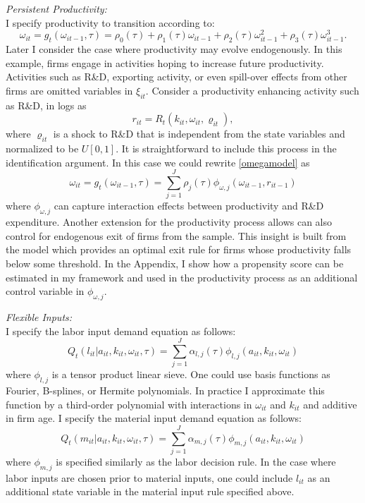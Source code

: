 \documentclass{article}
\begin{document}
\noindent \textit{Persistent Productivity:}\\
I specify productivity to transition according to:
\begin{equation}\label{omegamodel}
\omega_{it}=g_{t}(\omega_{it-1}, \tau)=\rho_{0}(\tau)+\rho_{1}(\tau)\omega_{it-1}+\rho_{2}(\tau)\omega^{2}_{it-1}+\rho_{3}(\tau)\omega^{3}_{it-1}.
\end{equation}
Later I consider the case where productivity may evolve endogenously. In this example, firms engage in activities hoping to increase future productivity. Activities such as R\&D, exporting activity, or even spill-over effects from other firms are omitted variables in $\xi_{it}$. Consider a productivity enhancing activity such as R\&D, in logs as
\begin{equation} 
r_{it}=R_{t}(k_{it}, \omega_{it}, \varrho_{it}),
\end{equation}
where $\varrho_{it}$ is a shock to R\&D that is independent from the state variables and normalized to be $U[0,1]$. It is straightforward to include this process in the identification argument. In this case we could rewrite \ref{omegamodel} as
\begin{equation}\label{omegaRDmodel}
\omega_{it}=g_{t}(\omega_{it-1}, \tau)=\sum_{j=1}^{J}\rho_{j}(\tau)\phi_{\omega,j}(\omega_{it-1}, r_{it-1})
\end{equation}
where $\phi_{\omega,j}$ can capture interaction effects between productivity and R\&D expenditure. Another extension for the productivity process allows can also control for endogenous exit of firms from the sample. This insight is built from the \cite{Olley1996} model which provides an optimal exit rule for firms whose productivity falls below some threshold. In the Appendix, I show how a propensity score can be estimated in my framework and used in the productivity process as an additional control variable in $\phi_{\omega,j}$.

\noindent \textit{Flexible Inputs:}\\
I specify the labor input demand equation as follows:
\begin{equation} \label{lmodel}
Q_{t}(l_{it}|a_{it}, k_{it}, \omega_{it}, \tau)=\sum_{j=1}^{J}\alpha_{l,j}(\tau)\phi_{l,j}(a_{it}, k_{it}, \omega_{it})
\end{equation}
where $\phi_{l,j}$ is a tensor product linear sieve. One could use basis functions as Fourier, B-splines, or Hermite polynomials. In practice I approximate this function by a third-order polynomial with interactions in $\omega_{it}$ and $k_{it}$ and additive in firm age. I specify the material input demand equation as follows:
\begin{equation}\label{mmodel}
Q_{t}(m_{it}|a_{it}, k_{it}, \omega_{it}, \tau)=\sum_{j=1}^{J}\alpha_{m,j}(\tau)\phi_{m,j}(a_{it}, k_{it}, \omega_{it})
\end{equation}
where $\phi_{m,j}$ is specified similarly as the labor decision rule. In the case where labor inputs are chosen prior to material inputs, one could include $l_{it}$ as an additional state variable in the material input rule specified above.\\
\end{document}

